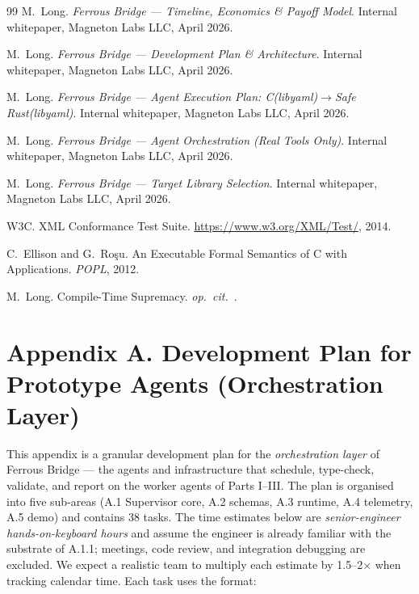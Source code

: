 \documentclass[12pt]{article}
\theoremstyle{definition}
\theoremstyle{remark}
\begin{document}
\begin{thebibliography}{99}
 M.~Long. \emph{Ferrous Bridge --- Timeline, Economics \& Payoff Model}. Internal whitepaper, Magneton Labs LLC, April 2026.

 M.~Long. \emph{Ferrous Bridge --- Development Plan \& Architecture}. Internal whitepaper, Magneton Labs LLC, April 2026.

 M.~Long. \emph{Ferrous Bridge --- Agent Execution Plan: C(libyaml)$\to$Safe Rust(libyaml)}. Internal whitepaper, Magneton Labs LLC, April 2026.

 M.~Long. \emph{Ferrous Bridge --- Agent Orchestration (Real Tools Only)}. Internal whitepaper, Magneton Labs LLC, April 2026.

 M.~Long. \emph{Ferrous Bridge --- Target Library Selection}. Internal whitepaper, Magneton Labs LLC, April 2026.

 W3C. XML Conformance Test Suite. \url{https://www.w3.org/XML/Test/}, 2014.

 C.~Ellison and G.~Ro\c{s}u. An Executable Formal Semantics of C with Applications. \emph{POPL}, 2012.

 M.~Long. Compile-Time Supremacy. \emph{op.~cit.}~\cite{long-c2rust-strategy}.

\end{thebibliography}

\appendix
{}
\label{app:devplan}
\section*{Appendix A. Development Plan for Prototype Agents (Orchestration Layer)}

This appendix is a granular development plan for the
\emph{orchestration layer} of Ferrous Bridge --- the agents and
infrastructure that schedule, type-check, validate, and report on the
worker agents of Parts I--III. The plan is organised into five
sub-areas (A.1 Supervisor core, A.2 schemas, A.3 runtime, A.4 telemetry,
A.5 demo) and contains 38 tasks. The time estimates below are
\emph{senior-engineer hands-on-keyboard hours} and assume the engineer
is already familiar with the substrate of A.1.1; meetings, code
review, and integration debugging are excluded. We expect a
realistic team to multiply each estimate by 1.5--2$\times$ when
tracking calendar time. Each task uses the format:
\end{document}
